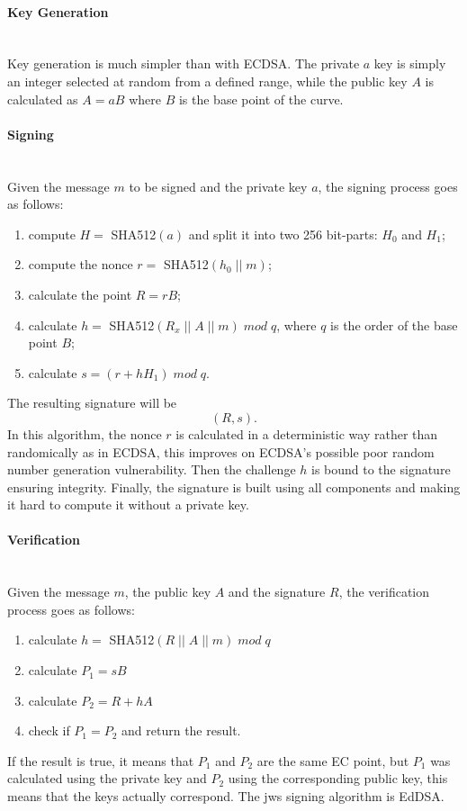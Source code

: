 \paragraph{Key Generation} \mbox{}\\
Key generation is much simpler than with ECDSA. The private $a$ key is simply an integer selected at random from a defined range, while the public key $A$ is calculated as $A = aB$ where $B$ is the base point of the curve. \cite{practical-crypto}

\paragraph{Signing} \mbox{}\\
Given the message $m$ to be signed and the private key $a$, the signing process goes as follows:
\begin{enumerate}
    \setlength\itemsep{-0.1em}
    \item compute $H =$ SHA512$(a)$ and split it into two 256 bit-parts: $H_0$ and $H_1$;
    \item compute the nonce $r =$ SHA512$(h_0 \; || \; m)$;
    \item calculate the point $R = rB$;
    \item calculate $h =$ SHA512$(R_x \; || \; A \; || \; m) \; mod \; q$, where $q$ is the order of the base point $B$;
    \item calculate $s = (r + hH_1) \; mod \; q$.
\end{enumerate}
The resulting signature will be 
\[(R, s).\]
In this algorithm, the nonce $r$ is calculated in a deterministic way rather than randomically as in ECDSA, this improves on ECDSA's possible poor random number generation vulnerability. Then the challenge $h$ is bound to the signature ensuring integrity. Finally, the signature is built using all components and making it hard to compute it without a private key.
\cite{practical-crypto} \cite{rfc8032-eddsa}

\paragraph{Verification} \mbox{}\\
Given the message $m$, the public key $A$ and the signature $R$, the verification process goes as follows:
\begin{enumerate} \setlength\itemsep{-0.1em}
    \item calculate $h =$ SHA512$(R \; || \; A \; || \; m) \; mod \; q$
    \item calculate $P_1 = sB$
    \item calculate $P_2 = R + hA$
    \item check if $P_1 = P_2$ and return the result.
\end{enumerate}
If the result is true, it means that $P_1$ and $P_2$ are the same EC point, but $P_1$ was calculated using the private key and $P_2$ using the corresponding public key, this means that the keys actually correspond.
\cite{practical-crypto} \cite{rfc8032-eddsa}
The \gls{jws} signing algorithm is EdDSA.

